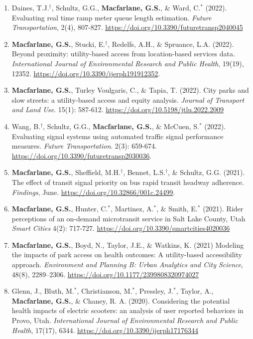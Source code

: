 \documentclass[margin,line]{res}
\newif\ifdetail
\newcounter{enuminitialize}
\newenvironment{myenum}[1][]
{%
 \setcounter{enuminitialize}{#1}
 \addtocounter{enuminitialize}{2}
 \begin{enumerate}[left= 4pt, itemsep=12pt, start=\value{enuminitialize}, label=\arabic*\addtocounter{enumi}{-2}]
}
{%
 \end{enumerate}
}
\begin{document}
\begin{resume}
\begin{myenum}[19]
  \item Daines, T.J.$^\dagger$, Schultz, G.G., \textbf{Macfarlane, G.S.}, \&
  Ward, C.$^*$ (2022). Evaluating real time ramp meter queue length estimation.
  \textit{Future Transportation}, 2(4), 807-827. \url{https://doi.org/10.3390/futuretransp2040045}

  \item \textbf{Macfarlane, G.S.}, Stucki, E.$^\dagger$, Redelfs, A.H., \& Spruance, L.A. (2022).
  Beyond proximity: utility-based access from location-based services data.
  \textit{International Journal of Environmental Research and Public Health}, 19(19), 12352.
  \url{https://doi.org/10.3390/ijerph191912352}.

  \item \textbf{Macfarlane, G.S.}, Turley Voulgaris, C., \& Tapia, T. (2022).
  City parks and slow streets: a utility-based access and equity analysis.
  \textit{Journal of Transport and Land Use}. 15(1): 587-612.
  \url{https://doi.org/10.5198/jtlu.2022.2009}

  \item Wang, B.$^\dagger$, Schultz, G.G., \textbf{Macfarlane, G.S.}, \& McCuen,
  S.$^*$ (2022). Evaluating signal systems using automated traffic signal
  performance measures. \textit{Future Transportation}. 2(3):  659-674.
  \url{https://doi.org/10.3390/futuretransp2030036}.

  \item \textbf{Macfarlane, G.S.}, Sheffield, M.H.$^\dagger$, Bennet, L.S.$^\dagger$, \& Schultz, G.G. (2021).
  The effect of transit signal priority on bus rapid transit headway adherence.
  \textit{Findings}, June. \url{https://doi.org/10.32866/001c.24499}.

  \item\textbf{Macfarlane, G.S.}, Hunter, C.$^*$, Martinez, A.$^*$, \& Smith, E.$^*$  (2021).
  Rider perceptions of an on-demand microtransit service in Salt Lake County, Utah
  \textit{ Smart Cities} 4(2): 717-727.
  \url{https://doi.org/10.3390/smartcities4020036} \ifdetail Citations: 1 \fi

  \item\textbf{Macfarlane, G.S.}, Boyd, N., Taylor, J.E., \& Watkins, K. (2021) Modeling the impacts of park access
on health outcomes: A utility-based accessibility approach. \textit{ Environment and
Planning B: Urban Analytics and City Science}, 48(8), 2289–2306. \url{https://doi.org/10.1177/2399808320974027}

  \item Glenn, J., Bluth, M.$^*$, Christianson, M.$^*$, Pressley, J.$^*$, Taylor, A., \textbf{Macfarlane, G.S.}, \& Chaney, R. A. (2020).
  Considering the potential health impacts of electric scooters: an analysis of user reported behaviors in Provo, Utah.
  \textit{ International Journal of Environmental Research and Public Health}, 17(17), 6344. \url{https://doi.org/10.3390/ijerph17176344} \ifdetail Citations: 5  \fi


\end{myenum}
\end{resume}
\end{document}
